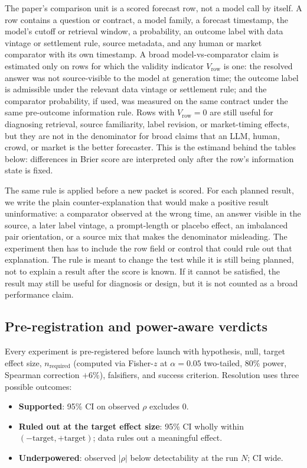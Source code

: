 \documentclass[11pt]{article}
\begin{document}
The paper's comparison unit is a scored forecast row, not a model call by itself. A row contains a question or contract, a model family, a forecast timestamp, the model's cutoff or retrieval window, a probability, an outcome label with data vintage or settlement rule, source metadata, and any human or market comparator with its own timestamp. A broad model-vs-comparator claim is estimated only on rows for which the validity indicator \(V_{\mathrm{row}}\) is one: the resolved answer was not source-visible to the model at generation time; the outcome label is admissible under the relevant data vintage or settlement rule; and the comparator probability, if used, was measured on the same contract under the same pre-outcome information rule. Rows with \(V_{\mathrm{row}}=0\) are still useful for diagnosing retrieval, source familiarity, label revision, or market-timing effects, but they are not in the denominator for broad claims that an LLM, human, crowd, or market is the better forecaster. This is the estimand behind the tables below: differences in Brier score are interpreted only after the row's information state is fixed.

The same rule is applied before a new packet is scored. For each planned result, we write the plain counter-explanation that would make a positive result uninformative: a comparator observed at the wrong time, an answer visible in the source, a later label vintage, a prompt-length or placebo effect, an imbalanced pair orientation, or a source mix that makes the denominator misleading. The experiment then has to include the row field or control that could rule out that explanation. The rule is meant to change the test while it is still being planned, not to explain a result after the score is known. If it cannot be satisfied, the result may still be useful for diagnosis or design, but it is not counted as a broad performance claim.

\subsection{Pre-registration and power-aware verdicts}

Every experiment is pre-registered before launch with hypothesis, null, target effect size, $n_{\text{required}}$ (computed via Fisher-$z$ at $\alpha{=}0.05$ two-tailed, $80\%$ power, Spearman correction $+6\%$), falsifiers, and success criterion. Resolution uses three possible outcomes:

\begin{itemize}[leftmargin=*]
\item \textbf{Supported}: 95\% CI on observed $\rho$ excludes 0.
\item \textbf{Ruled out at the target effect size}: 95\% CI wholly within $(-\text{target}, +\text{target})$; data rules out a meaningful effect.
\item \textbf{Underpowered}: observed $|\rho|$ below detectability at the run $N$; CI wide.
\end{itemize}
\end{document}
